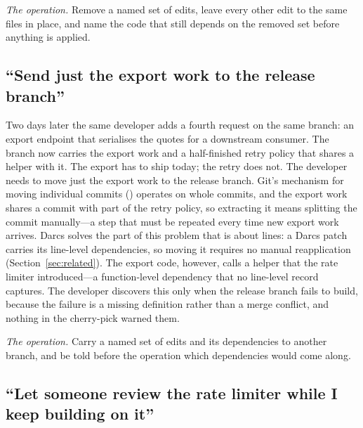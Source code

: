 \smallskip\noindent\emph{The operation.} Remove a named set of edits, leave every
other edit to the same files in place, and name the code that still depends on the
removed set before anything is applied.

\subsection{``Send just the export work to the release branch''}

Two days later the same developer adds a fourth request on the same branch: an
export endpoint that serialises the quotes for a downstream consumer. The branch
now carries the export work and a half-finished retry policy that shares a helper
with it. The export has to ship today; the retry does not. The developer needs to
move just the export work to the release branch. Git's mechanism for moving individual commits
() operates on whole commits, and the export work shares a
commit with part of the retry policy, so extracting it means splitting the commit
manually---a step that must be repeated every time new export work arrives.
Darcs solves the part of this problem that is about lines: a Darcs patch
carries its line-level dependencies, so moving it requires no manual
reapplication (Section~\ref{sec:related}). The export code, however, calls a
helper that the rate limiter introduced---a function-level dependency that no
line-level record captures. The developer discovers this only when the release
branch fails to build, because the failure is a missing definition rather than
a merge conflict, and nothing in the cherry-pick warned them.

\smallskip\noindent\emph{The operation.} Carry a named set of edits and its
dependencies to another branch, and be told before the operation which dependencies
would come along.

\subsection{``Let someone review the rate limiter while I keep building on it''}

